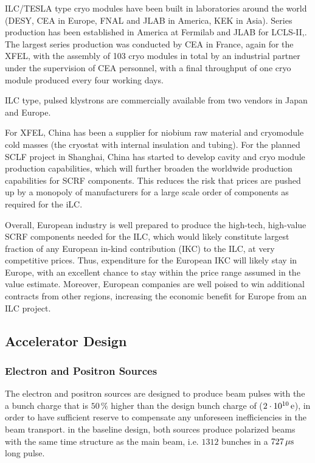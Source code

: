 ILC/TESLA type cryo modules have been built in laboratories around the world (DESY, CEA in Europe, FNAL and JLAB in America, KEK in Asia).
Series production has been established in America at Fermilab and JLAB for LCLS-II,.
The largest series production was conducted by CEA in France, again for the XFEL, with the assembly of \num{103} cryo modules in total by an industrial partner under the supervision of CEA personnel, with a final throughput of one cryo module produced every four working days.

ILC type, pulsed  klystrons are commercially available from two vendors in Japan and Europe.

For XFEL, China has been a supplier for niobium raw material and cryomodule cold masses (the cryostat with internal insulation and tubing).
For the planned SCLF project in Shanghai, China has started to develop cavity and cryo module production capabilities, which will further broaden the worldwide production capabilities for SCRF components.
This reduces the risk that prices are pushed up by a monopoly of manufacturers for a large scale order of components as required for the iLC.

Overall, European industry is well prepared to produce the high-tech, high-value SCRF components needed for the ILC, which would likely constitute largest fraction of any European in-kind contribution (IKC) to the ILC, at very competitive prices.
Thus, expenditure for the European IKC will likely stay in Europe, with an excellent chance to stay within the price range assumed in the value estimate.
Moreover, European companies are well poised to win additional contracts from other regions, increasing the economic benefit for Europe from an ILC project.




\subsection{Accelerator Design}

\subsubsection{Electron and Positron Sources}

The electron and positron sources are designed to produce  beam pulses with the a bunch charge that is $50\,\%$ higher than the design bunch charge of  ($2\cdot 10^{10}\,{\mathrm{e}}$), in order to have sufficient reserve to compensate  any unforeseen inefficiencies in the beam transport.
in the baseline design, both sources produce polarized beams with the same time structure as the main beam, i.e. $1312$ bunches in a $727\,{\mathrm{\mu s}}$ long pulse.

